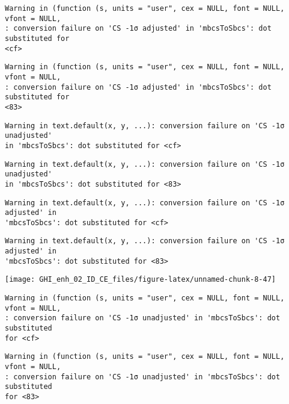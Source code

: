 \documentclass[
  10pt,
  a4paper,oneside]{article}
\begin{document}
\begin{verbatim}
Warning in (function (s, units = "user", cex = NULL, font = NULL, vfont = NULL,
: conversion failure on 'CS -1σ adjusted' in 'mbcsToSbcs': dot substituted for
<cf>
\end{verbatim}

\begin{verbatim}
Warning in (function (s, units = "user", cex = NULL, font = NULL, vfont = NULL,
: conversion failure on 'CS -1σ adjusted' in 'mbcsToSbcs': dot substituted for
<83>
\end{verbatim}

\begin{verbatim}
Warning in text.default(x, y, ...): conversion failure on 'CS -1σ unadjusted'
in 'mbcsToSbcs': dot substituted for <cf>
\end{verbatim}

\begin{verbatim}
Warning in text.default(x, y, ...): conversion failure on 'CS -1σ unadjusted'
in 'mbcsToSbcs': dot substituted for <83>
\end{verbatim}

\begin{verbatim}
Warning in text.default(x, y, ...): conversion failure on 'CS -1σ adjusted' in
'mbcsToSbcs': dot substituted for <cf>
\end{verbatim}

\begin{verbatim}
Warning in text.default(x, y, ...): conversion failure on 'CS -1σ adjusted' in
'mbcsToSbcs': dot substituted for <83>
\end{verbatim}

\begin{center}\texttt{[image: GHI\_enh\_02\_ID\_CE\_files/figure-latex/unnamed-chunk-8-47]} \end{center}

\begin{verbatim}
Warning in (function (s, units = "user", cex = NULL, font = NULL, vfont = NULL,
: conversion failure on 'CS -1σ unadjusted' in 'mbcsToSbcs': dot substituted
for <cf>
\end{verbatim}

\begin{verbatim}
Warning in (function (s, units = "user", cex = NULL, font = NULL, vfont = NULL,
: conversion failure on 'CS -1σ unadjusted' in 'mbcsToSbcs': dot substituted
for <83>
\end{verbatim}
\end{document}

